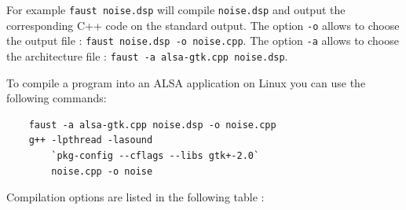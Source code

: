 \documentclass[a4paper]{book}
\begin{document}
For example \lstinline'faust noise.dsp' will compile \lstinline'noise.dsp' and output the corresponding C++ code on the standard output.  The option \lstinline'-o' allows to choose the output file : \lstinline'faust noise.dsp -o noise.cpp'. The option \lstinline'-a' allows to choose the architecture file : \lstinline'faust -a alsa-gtk.cpp noise.dsp'. 

To compile a \faust program into an ALSA application on Linux you can use the following commands: 
\begin{lstlisting}
	faust -a alsa-gtk.cpp noise.dsp -o noise.cpp
	g++ -lpthread -lasound  
		`pkg-config --cflags --libs gtk+-2.0` 
		noise.cpp -o noise
\end{lstlisting} 


Compilation options are listed in the following table :

\bigskip

\small

\tablelasttail{
  \hline
}
\end{document}
